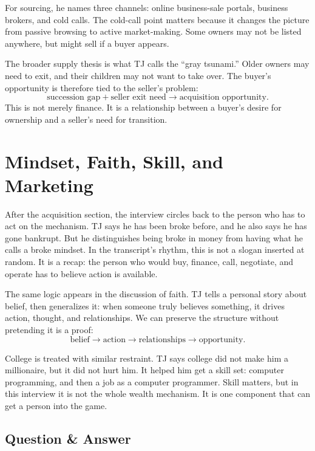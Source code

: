 For sourcing, he names three channels: online business-sale portals, business brokers, and cold calls. The cold-call point matters because it changes the picture from passive browsing to active market-making. Some owners may not be listed anywhere, but might sell if a buyer appears.

The broader supply thesis is what TJ calls the ``gray tsunami.'' Older owners may need to exit, and their children may not want to take over. The buyer's opportunity is therefore tied to the seller's problem:
\begin{equation}
\text{succession gap}+\text{seller exit need}
\longrightarrow
\text{acquisition opportunity}.
\end{equation}
This is not merely finance. It is a relationship between a buyer's desire for ownership and a seller's need for transition.

\section{Mindset, Faith, Skill, and Marketing}

After the acquisition section, the interview circles back to the person who has to act on the mechanism. TJ says he has been broke before, and he also says he has gone bankrupt. But he distinguishes being broke in money from having what he calls a broke mindset. In the transcript's rhythm, this is not a slogan inserted at random. It is a recap: the person who would buy, finance, call, negotiate, and operate has to believe action is available.

The same logic appears in the discussion of faith. TJ tells a personal story about belief, then generalizes it: when someone truly believes something, it drives action, thought, and relationships. We can preserve the structure without pretending it is a proof:
\begin{equation}
\text{belief}
\longrightarrow
\text{action}
\longrightarrow
\text{relationships}
\longrightarrow
\text{opportunity}.
\end{equation}

College is treated with similar restraint. TJ says college did not make him a millionaire, but it did not hurt him. It helped him get a skill set: computer programming, and then a job as a computer programmer. Skill matters, but in this interview it is not the whole wealth mechanism. It is one component that can get a person into the game.

\subsection{Question \& Answer}

